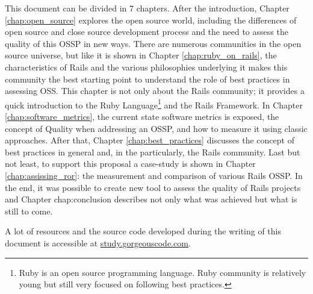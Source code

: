This document can be divided in 7 chapters.
After the introduction, Chapter \ref{chap:open_source} explores the open source world,
including the differences of open source and close source development process
and the need to assess the quality of this OSSP in new ways.
There are numerous communities in the open source universe, but like it is shown in Chapter \ref{chap:ruby_on_rails},
the characteristics of Rails and the various philosophies underlying it 
makes this community the best starting point to understand the role of best practices in assessing OSS.
This chapter is not only about the Rails community; it provides a quick introduction to the \textsf{Ruby Language}\footnote{
  Ruby is an open source programming language. Ruby community is relatively young but still very focused on following best practices.
} and the Rails Framework.
In Chapter \ref{chap:software_metrics}, the current state software metrics is exposed,
the concept of Quality when addressing an OSSP, and how to measure it using classic approaches.
After that, Chapter \ref{chap:best_practices} discusses the concept of best practices in general and, 
in the particularly, the Rails community.
Last but not least, to support this proposal a case-study is shown in Chapter \ref{chap:assissing_ror}: 
the measurement and comparison of various Rails OSSP.
In the end, it was possible to create new tool to assess the quality of Rails projects and 
Chapter {chap:conclusion} describes not only what was achieved but what is still to come.

A lot of resources and the source code developed during the writing of this document is accessible at 
\url{study.gorgeouscode.com}.

